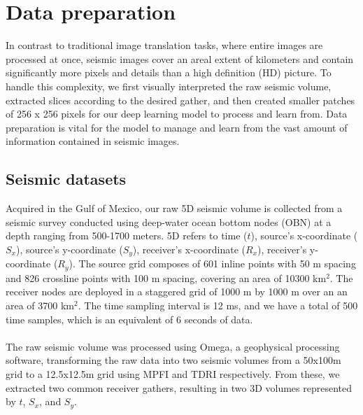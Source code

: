 \section{Data preparation} 
In contrast to traditional image translation tasks, where entire images are processed at once, seismic images cover an areal extent of kilometers and contain significantly more pixels and details than a high definition (HD) picture. To handle this complexity, we first visually interpreted the raw seismic volume, extracted slices according to the desired gather, and then created smaller patches of 256 x 256 pixels for our deep learning model to process and learn from. Data preparation is vital for the model to manage and learn from the vast amount of information contained in seismic images.

\subsection{Seismic datasets}
Acquired in the Gulf of Mexico, our raw 5D seismic volume is collected from a seismic survey conducted using deep-water ocean bottom nodes (OBN) at a depth ranging from 500-1700 meters. 5D refers to time ($t$), source's x-coordinate ($S_{x}$), source's y-coordinate ($S_{y}$), receiver's x-coordinate ($R_{x}$), receiver's y-coordinate ($R_{y}$). The source grid composes of 601 inline points with 50 m spacing and 826 crossline points with 100 m spacing, covering an area of 10300 km$^{2}$. The receiver nodes are deployed in a staggered grid of 1000 m by 1000 m over an an area of 3700 km$^{2}$. The time sampling interval is 12 ms, and we have a total of 500 time samples, which is an equivalent of 6 seconds of data.
\\\\
The raw seismic volume was processed using Omega, a geophysical processing software, transforming the raw data into two seismic volumes from a 50x100m grid to a 12.5x12.5m grid using MPFI and TDRI respectively. From these, we extracted two common receiver gathers, resulting in two 3D volumes represented by $t$, $S_{x}$, and $S_{y}$.
\\\\

